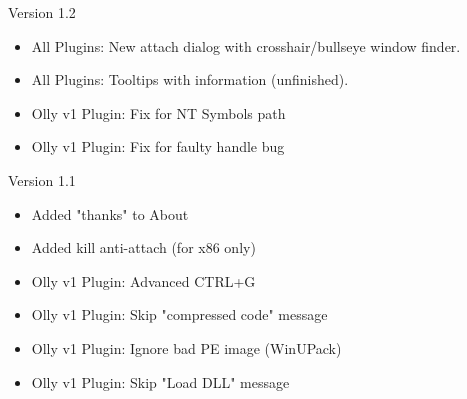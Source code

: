 \documentclass[10pt,a4paper]{article}
\begin{document}
Version 1.2
\begin{itemize}
\item All Plugins: New attach dialog with crosshair/bullseye window finder.
\item All Plugins: Tooltips with information (unfinished).
\item Olly v1 Plugin: Fix for NT Symbols path
\item Olly v1 Plugin: Fix for faulty handle bug
\end{itemize}

Version 1.1
\begin{itemize}
\item Added "thanks" to About
\item Added kill anti-attach (for x86 only)
\item Olly v1 Plugin: Advanced CTRL+G
\item Olly v1 Plugin: Skip "compressed code" message
\item Olly v1 Plugin: Ignore bad PE image (WinUPack)
\item Olly v1 Plugin: Skip "Load DLL" message
\end{itemize}


\end{document}
